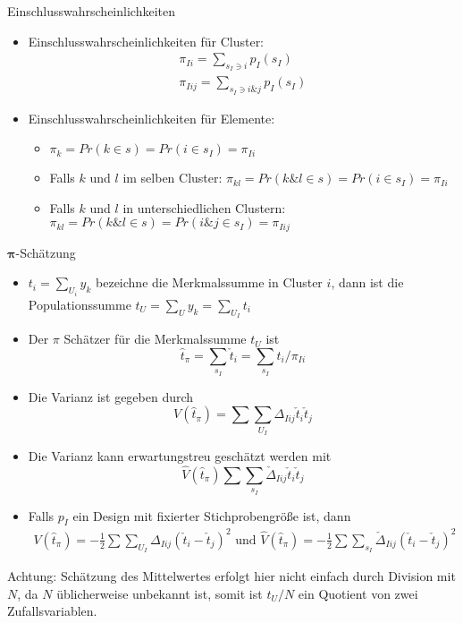 \documentclass[9pt]{beamer}
\begin{document}
\begin{frame}{Einschlusswahrscheinlichkeiten}
\begin{itemize}
\item Einschlusswahrscheinlichkeiten für Cluster:
\begin{align*}
\pi_{Ii} = \sum_{s_I \ni i} p_I(s_I)\\
\pi_{Iij} = \sum_{s_I \ni i \& j} p_I(s_I)
\end{align*}
\item Einschlusswahrscheinlichkeiten für Elemente:
\begin{itemize} 
	\item $\pi_k = Pr(k \in s)= Pr(i\in s_I) = \pi_{Ii}$
	\item Falls $k$ und $l$ im selben Cluster: $\pi_{kl} = Pr(k \&l \in s) = Pr(i \in s_I) = \pi_{Ii}$
	\item Falls $k$ und $l$ in unterschiedlichen Clustern: $\pi_{kl} = Pr(k \&l \in s) = Pr(i \& j \in s_I) = \pi_{Iij}$
	\end{itemize}
\end{itemize}
\end{frame}

\begin{frame}{$\boldsymbol{\pi}$-Schätzung}

\begin{itemize}
	\item $t_i = \sum_{U_i} y_k$ bezeichne die Merkmalssumme in Cluster $i$, dann ist die Populationssumme $t_U = \sum_U y_k = \sum_{U_I} t_i$	
	\item Der $\pi$ Schätzer für die Merkmalssumme $t_U$ ist $$\hat{t}_\pi = \sum_{s_I} \check{t}_i = \sum_{s_I} t_i/\pi_{Ii}$$
	\item Die Varianz ist gegeben durch $$V(\hat{t}_\pi) = \sum\sum_{U_I} \Delta_{Iij}\check{t}_i \check{t}_j$$
	\item Die Varianz kann erwartungstreu geschätzt werden mit $$\hat{V}(\hat{t}_\pi) \sum\sum_{s_I} \check{\Delta}_{Iij}\check{t}_i \check{t}_j$$
	\item Falls $p_I$ ein Design mit fixierter Stichprobengröße ist, dann
	\begin{align*}
	V(\hat{t}_\pi) = -\frac{1}{2}\sum\sum_{U_I} \Delta_{Iij}(\check{t}_i - \check{t}_j)^2 \text{ und }
	\hat{V}(\hat{t}_\pi) = -\frac{1}{2}\sum\sum_{s_I} \check{\Delta}_{Iij}(\check{t}_i - \check{t}_j)^2
	\end{align*}
\end{itemize}
Achtung: Schätzung des Mittelwertes erfolgt hier nicht einfach durch Division mit $N$, da $N$ üblicherweise unbekannt ist, somit ist $t_U/N$ ein Quotient von zwei Zufallsvariablen.
\end{frame}
\end{document}

